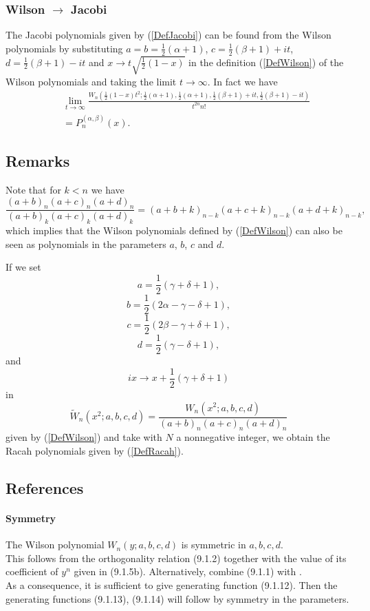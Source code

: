 \documentclass[envcountchap,graybox]{svmono}
\newcounter{rom}
\begin{document}
\subsubsection*{Wilson $\rightarrow$ Jacobi}
The Jacobi polynomials given by (\ref{DefJacobi}) can be found from the Wilson
polynomials by substituting $a=b=\frac{1}{2}(\alpha+1)$, $c=\frac{1}{2}(\beta+1)+it$,
$d=\frac{1}{2}(\beta+1)-it$ and $x\rightarrow t\sqrt{\frac{1}{2}(1-x)}$ in the
definition (\ref{DefWilson}) of the Wilson polynomials and taking the limit
$t\rightarrow\infty$. In fact we have
\begin{eqnarray}
& &\lim_{t\rightarrow\infty}\frac{W_n(\frac{1}{2}(1-x)t^2;\frac{1}{2}(\alpha+1),
\frac{1}{2}(\alpha+1),\frac{1}{2}(\beta+1)+it,\frac{1}{2}(\beta+1)-it)}{t^{2n}n!}\nonumber\\
& &{}=P_n^{(\alpha,\beta)}(x).
\end{eqnarray}

\subsection*{Remarks}
Note that for $k<n$ we have
$$\frac{(a+b)_n(a+c)_n(a+d)_n}{(a+b)_k(a+c)_k(a+d)_k}=(a+b+k)_{n-k}(a+c+k)_{n-k}(a+d+k)_{n-k},$$
which implies that the Wilson polynomials defined by (\ref{DefWilson}) can also be
seen as polynomials in the parameters $a$, $b$, $c$ and $d$.

\noindent
If we set
$$a=\textstyle\frac{1}{2}(\gamma+\delta+1),$$
$$b=\textstyle\frac{1}{2}(2\alpha-\gamma-\delta+1),$$
$$c=\textstyle\frac{1}{2}(2\beta-\gamma+\delta+1),$$
$$d=\textstyle\frac{1}{2}(\gamma-\delta+1),$$
and
$$ix\rightarrow x+\textstyle\frac{1}{2}(\gamma+\delta+1)$$
in
\begin{equation}
{\tilde{W}}_n(x^2;a,b,c,d)=\frac{W_n(x^2;a,b,c,d)}{(a+b)_n(a+c)_n(a+d)_n}
\end{equation}
given by (\ref{DefWilson}) and take
with $N$ a nonnegative integer, we obtain the Racah polynomials given by (\ref{DefRacah}).

\subsection*{References}
\label{sec9.1}
%
\paragraph{Symmetry}
The Wilson polynomial $W_n(y;a,b,c,d)$ is symmetric
in $a,b,c,d$.
\\
This follows from the orthogonality relation (9.1.2)
together with the value of its coefficient of $y^n$ given in (9.1.5b).
Alternatively, combine (9.1.1) with .\\
As a consequence, it is sufficient to give generating function (9.1.12). Then the generating
functions (9.1.13), (9.1.14) will follow by symmetry in the parameters.
%
\end{document}
